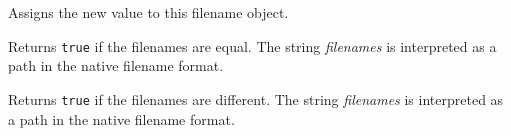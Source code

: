 

Assigns the new value to this filename object.


\label{wxfilenameoperatorequal}



Returns {\tt true} if the filenames are equal. The string {\it filenames} is
interpreted as a path in the native filename format.


\label{wxfilenameoperatornotequal}



Returns {\tt true} if the filenames are different. The string {\it filenames}
is interpreted as a path in the native filename format.

